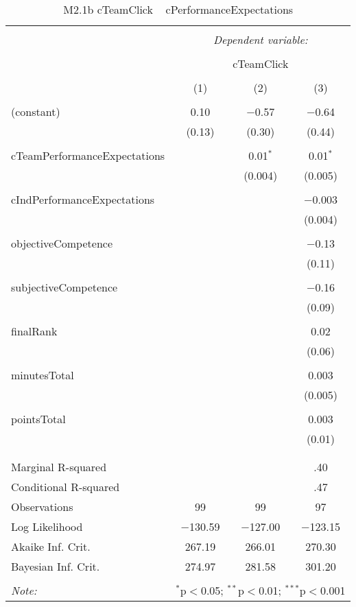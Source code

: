 
\begin{table}[!htbp] \centering 
  \caption{M2.1b cTeamClick ~ cPerformanceExpectations} 
  \label{tab:MLM21bcTeamPerfExpcClick} 
\begin{tabular}{@{\extracolsep{5pt}}lccc} 
\\[-1.8ex]\hline 
\hline \\[-1.8ex] 
 & \multicolumn{3}{c}{\textit{Dependent variable:}} \\ 
\cline{2-4} 
\\[-1.8ex] & \multicolumn{3}{c}{cTeamClick} \\ 
\\[-1.8ex] & (1) & (2) & (3)\\ 
\hline \\[-1.8ex] 
 (constant) & 0.10 & $-$0.57 & $-$0.64 \\ 
  & (0.13) & (0.30) & (0.44) \\ 
  & & & \\ 
 cTeamPerformanceExpectations &  & 0.01$^{*}$ & 0.01$^{*}$ \\ 
  &  & (0.004) & (0.005) \\ 
  & & & \\ 
 cIndPerformanceExpectations &  &  & $-$0.003 \\ 
  &  &  & (0.004) \\ 
  & & & \\ 
 objectiveCompetence &  &  & $-$0.13 \\ 
  &  &  & (0.11) \\ 
  & & & \\ 
 subjectiveCompetence &  &  & $-$0.16 \\ 
  &  &  & (0.09) \\ 
  & & & \\ 
 finalRank &  &  & 0.02 \\ 
  &  &  & (0.06) \\ 
  & & & \\ 
 minutesTotal &  &  & 0.003 \\ 
  &  &  & (0.005) \\ 
  & & & \\ 
 pointsTotal &  &  & 0.003 \\ 
  &  &  & (0.01) \\ 
  & & & \\ 
\hline \\[-1.8ex] 
Marginal R-squared &  &  & .40 \\ 
Conditional R-squared &  &  & .47 \\ 
Observations & 99 & 99 & 97 \\ 
Log Likelihood & $-$130.59 & $-$127.00 & $-$123.15 \\ 
Akaike Inf. Crit. & 267.19 & 266.01 & 270.30 \\ 
Bayesian Inf. Crit. & 274.97 & 281.58 & 301.20 \\ 
\hline 
\hline \\[-1.8ex] 
\textit{Note:}  & \multicolumn{3}{r}{$^{*}$p$<$0.05; $^{**}$p$<$0.01; $^{***}$p$<$0.001} \\ 
\end{tabular} 
\end{table} 
